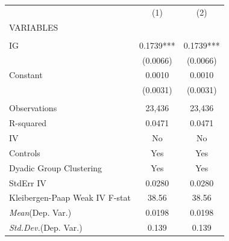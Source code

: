\documentclass[]{article}
\begin{document}
\begin{tabular}{lcc} \hline
 & (1) & (2) \\
VARIABLES &  &  \\ \hline
 &  &  \\
IG & 0.1739*** & 0.1739*** \\
 & (0.0066) & (0.0066) \\
Constant & 0.0010 & 0.0010 \\
 & (0.0031) & (0.0031) \\
 &  &  \\
Observations & 23,436 & 23,436 \\
R-squared & 0.0471 & 0.0471 \\
IV & No & No \\
Controls & Yes & Yes \\
Dyadic Group Clustering & Yes & Yes \\
StdErr IV & 0.0280 & 0.0280 \\
Kleibergen-Paap Weak IV F-stat & 38.56 & 38.56 \\
\textit{Mean}(Dep. Var.) & 0.0198 & 0.0198 \\
 \textit{Std.Dev.}(Dep. Var.) & 0.139 & 0.139 \\ \hline
\end{tabular}
\end{document}
